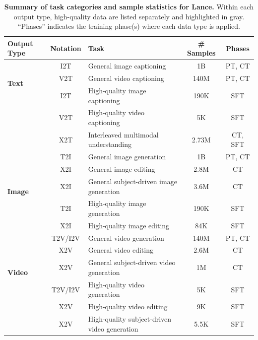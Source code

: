 \documentclass{llmxive}
\providecommand{\arraystretch}{1.16}
\begin{document}





\begin{table}[t]
\centering
\small
\setlength{\tabcolsep}{5pt}
\renewcommand{\arraystretch}{1.15}
\begin{tabular}{lcp{7.5cm}cc}
\toprule
\textbf{Output Type} & \textbf{Notation} & \textbf{Task} & \textbf{\# Samples} & \textbf{Phases} \\
\midrule

\multirow{3}{*}{\textbf{Text}}
& I2T  & General image captioning                     & 1B    & PT, CT \\
& V2T  & General video captioning                     & 140M  & PT, CT \\
\rowcolor{gray!20}
& I2T  & High-quality image captioning                & 190K  & SFT \\
\rowcolor{gray!20}
& V2T  & High-quality video captioning                & 5K    & SFT \\
\rowcolor{gray!20}
& X2T  & Interleaved multimodal understanding         & 2.73M & CT, SFT \\
\midrule

\multirow{5}{*}{\textbf{Image}}
& T2I  & General image generation                     & 1B    & PT, CT \\
& X2I & General image editing             & 2.8M  & CT \\
& X2I  & General subject-driven image generation          & 3.6M  & CT \\
\rowcolor{gray!20}
& T2I  & High-quality image generation                & 190K  & SFT \\
\rowcolor{gray!20}
& X2I & High-quality image editing                   & 84K   & SFT \\
\midrule

\multirow{5}{*}{\textbf{Video}}
& T2V/I2V  & General video generation                     & 140M  & PT, CT \\
& X2V  & General video editing            & 2.6M  & CT \\
& X2V  & General subject-driven video generation         & 1M    & CT \\
\rowcolor{gray!20}
& T2V/I2V  & High-quality video generation                & 5K    & SFT \\
\rowcolor{gray!20}
& X2V  & High-quality video editing                   & 9K    & SFT \\
\rowcolor{gray!20}
& X2V  & High-quality subject-driven video generation & 5.5K &  SFT \\
\bottomrule
\end{tabular}
\caption{\textbf{Summary of task categories and sample statistics for Lance.}
Within each output type, high-quality data are listed separately and highlighted in gray. ``Phases'' indicates the training phase(s) where each data type is applied. 
}
\label{tab:task_data_summary}
\end{table}
\end{document}

